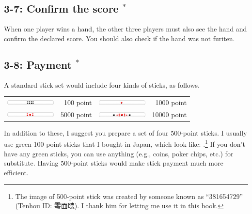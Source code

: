 \subsection*{3-7: Confirm the score $^{*}$}
When one player wins a hand, the other three players must also see the hand and confirm the declared score. You should also check if the hand was not {\jap furiten}. 

\subsection*{3-8: Payment $^{*}$}
A standard stick set would include four kinds of sticks, as follows.

\bigskip
\begin{tabular}{l r l r}
\includegraphics[width=1in]{figs/tenbou100} & 100 point & 
\includegraphics[width=1in]{figs/tenbou1000} & 1000 point \\
\includegraphics[width=1in]{figs/tenbou5000} & 5000 point & 
\includegraphics[width=1in]{figs/tenbou10000} & 10000 point \\
\end{tabular}


\bigskip \noindent
In addition to these, I suggest you prepare a set of four 500-point sticks. I usually use green 100-point sticks that I bought in Japan, which look like: .\footnote{The image of 500-point stick was created by someone known as ``381654729'' ({\jap Tenhou} ID: 零面聴). I thank him for letting me use it in this book.} If you don't have any green sticks, you can use anything (e.g., coins, poker chips, etc.) for substitute. 
Having 500-point sticks would make stick payment much more efficient.

